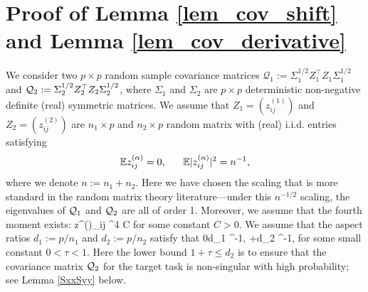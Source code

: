 \section{Proof of Lemma \ref{lem_cov_shift} and Lemma \ref{lem_cov_derivative}} \label{sec_maintools}

%

We consider two $p\times p$ random sample covariance matrices $\mathcal Q_1:=\Sigma_1^{1/2}Z_1^\top Z_1\Sigma_1^{1/2}$ and $\cal Q_2:= \Sigma_2^{1/2}Z_2^\top Z_2\Sigma_2^{1/2}$, where $\Sigma_1$ and $\Sigma_2$ are $p\times p$ deterministic non-negative definite (real) symmetric matrices. We assume that $Z_1=(z^{(1)}_{ij})$ and $Z_2=(z^{(2)}_{ij})$ are $n_1\times p$ and $n_2\times p$ random matrix with (real) i.i.d. entries satisfying
\begin{equation}\label{assm1}
\mathbb{E} z^{(\al)}_{ij} =0, \ \quad \ \mathbb{E} \vert z^{(\al)}_{ij} \vert^2  =n^{-1}, 
\end{equation}
where we denote $n:=n_1+n_2$. Here we have chosen the scaling that is more standard in the random matrix theory literature---under this $n^{-1/2}$ scaling, the eigenvalues of $\cal Q_1$ and $\cal Q_2$ are all of order 1. Moreover, we assume that the fourth moment exists:
\be \label{conditionA2}
 \vert {}z^{(\al)}_{ij} \vert^4  \le C
\ee
for some constant $C>0$. 
We assume that the aspect ratios $d_1:= p/n_1$ and $d_2:=p/n_2$ satisfy that 
\be\label{assm2}
0\le d_1 \le \tau^{-1}, +\tau \le d_{2} \le \tau^{-1},
\ee
for some small constant $0<\tau <1$. Here the lower bound $1+\tau\le d_2$ is to ensure that the covariance matrix $\cal Q_2$ for the target task is non-singular with high probability; see Lemma \ref{SxxSyy} below. 

